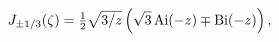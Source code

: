 \[\mathop{J_{\pm 1/3}\/}\nolimits\!\left(\zeta\right)=\tfrac{1}{2}\sqrt{3/z}%
\left(\sqrt{3}\mathop{\mathrm{Ai}\/}\nolimits\!\left(-z\right)\mp\mathop{%
\mathrm{Bi}\/}\nolimits\!\left(-z\right)\right),\]